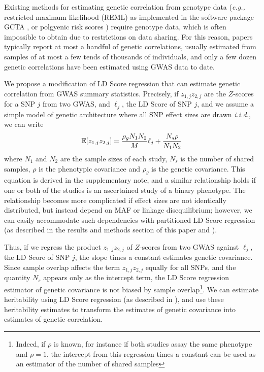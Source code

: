 \documentclass[11pt]{article}
\numberwithin{equation}{section}
\begin{document}
Existing methods for estimating genetic correlation from genotype data 
(\emph{e.g.,} restricted maximum likelihood (REML) as implemented in the software package GCTA 
\cite{yang2010, yang2011gcta}, or polgyenic risk scores \cite{dudbridge2013power})
require genotype data, which is often impossible to obtain due to restrictions on data sharing. 
For this reason, papers typically report at most a handful of genetic correlations, 
usually estimated from samples of at most a few tends of thousands of individuals,
and only a few dozen genetic correlations have been estimated using GWAS data to date.


We propose a modification of LD Score regression \cite{buliksullivan2014}
that can estimate genetic correlation from GWAS summary statistics. 
Precisely, if $z_{1,j}z_{2,j}$ are the $Z$-scores for a SNP $j$ from two GWAS, and $\ell_j$, the LD Score of SNP $j$,
and we assume a simple model of genetic architecture where all SNP effect sizes are drawn \emph{i.i.d.}, we can write
\begin{equation}
		\mathbb{E}[z_{1,j}z_{2,j}] = \dfrac{\rho_gN_1N_2}{M}\ell_j + \dfrac{N_s\rho}{N_1N_2}
\end{equation}
where $N_1$ and $N_2$ are the sample sizes of each study, $N_s$ is the number of shared samples,
$\rho$ is the phenotypic covariance and $\rho_g$ is the genetic covariance. 
This equation is derived in the supplementary note, and a similar relationship holds if one or both of the studies 
is an ascertained study of a binary phenotype. 
The relationship becomes more complicated if effect sizes are not identically distributed, but instead depend on MAF 
or linkage disequilibrium; 
however, we can easily accommodate such dependencies with partitioned LD Score regression 
(as described in the results and methods section of this paper and \cite{finucane2014partitioning}).

Thus, if we regress the product $z_{1,j}z_{2,j}$ of $Z$-scores from two GWAS against $\ell_j$, the LD Score of SNP $j$, 
the slope times a constant estimates genetic covariance.
Since sample overlap affects the term $z_{1,j}z_{2,j}$ equally for all SNPs, and the quantity $N_s$ appears only 
as the intercept term, the LD Score regression estimator of genetic covariance is not biased by sample overlap\footnote{
Indeed, if $\rho$ is known, for instance if both studies assay the same phenotype and $\rho=1$, the intercept 
from this regression times a constant can be used as an estimator of the number of shared samples}.
We can estimate heritability using LD Score regression (as described in \cite{buliksullivan2014}),
and use these heritability estimates to transform the estimates of genetic covariance into estimates of genetic correlation.
\end{document}
